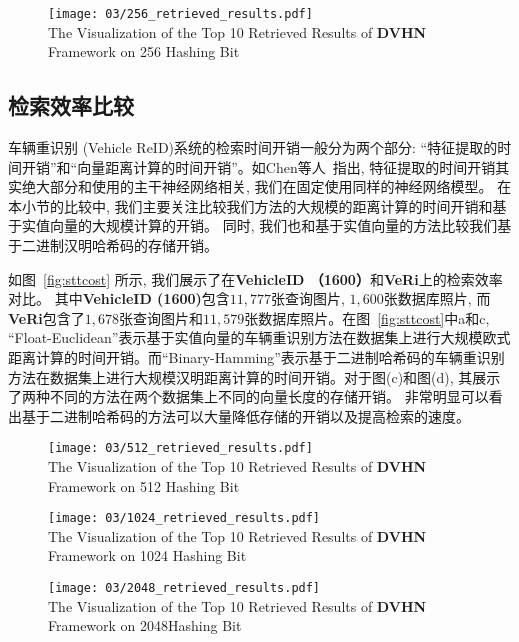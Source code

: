 \begin{figure}[!htp]
    \centering
    \texttt{[image: 03/256\_retrieved\_results.pdf]} \\
      {The Visualization of the Top 10 Retrieved Results of \textbf{DVHN} Framework on 256 Hashing Bit}
   \label{fig:retrieval256}
\end{figure}
\subsection{检索效率比较}
车辆重识别 (Vehicle ReID)系统的检索时间开销一般分为两个部分: ``特征提取的时间开销''和``向量距离计算的时间开销''。如Chen等人~\cite{chen2020deep}指出, 特征提取的时间开销其实绝大部分和使用的主干神经网络相关, 我们在固定使用同样的神经网络模型。 在本小节的比较中, 我们主要关注比较我们方法的大规模的距离计算的时间开销和基于实值向量的大规模计算的开销。 同时, 我们也和基于实值向量的方法比较我们基于二进制汉明哈希码的存储开销。\par
如图~\ref{fig:sttcost} 所示, 我们展示了在\textbf{VehicleID （1600）}和\textbf{VeRi}上的检索效率对比。 其中\textbf{VehicleID (1600)}包含$11,777$张查询图片, $1,600$张数据库照片, 而 \textbf{VeRi}包含了$1,678$张查询图片和$11,579$张数据库照片。在图~\ref{fig:sttcost}中a和c, ``Float-Euclidean''表示基于实值向量的车辆重识别方法在数据集上进行大规模欧式距离计算的时间开销。而``Binary-Hamming''表示基于二进制哈希码的车辆重识别方法在数据集上进行大规模汉明距离计算的时间开销。对于图(c)和图(d), 其展示了两种不同的方法在两个数据集上不同的向量长度的存储开销。 非常明显可以看出基于二进制哈希码的方法可以大量降低存储的开销以及提高检索的速度。
\begin{figure}[!htp]
    \centering
    \texttt{[image: 03/512\_retrieved\_results.pdf]} \\
      {The Visualization of the Top 10 Retrieved Results of \textbf{DVHN} Framework on 512 Hashing Bit}
   \label{fig:retrieval512}
\end{figure}
\begin{figure}[!htp]
    \centering
    \texttt{[image: 03/1024\_retrieved\_results.pdf]} \\
      {The Visualization of the Top 10 Retrieved Results of \textbf{DVHN} Framework on 1024 Hashing Bit}
   \label{fig:retrieval1024}
\end{figure}
\begin{figure}[!htp]
    \centering
    \texttt{[image: 03/2048\_retrieved\_results.pdf]} \\
      {The Visualization of the Top 10 Retrieved Results of \textbf{DVHN} Framework on 2048Hashing Bit}
   \label{fig:retrieval2048}
\end{figure}
